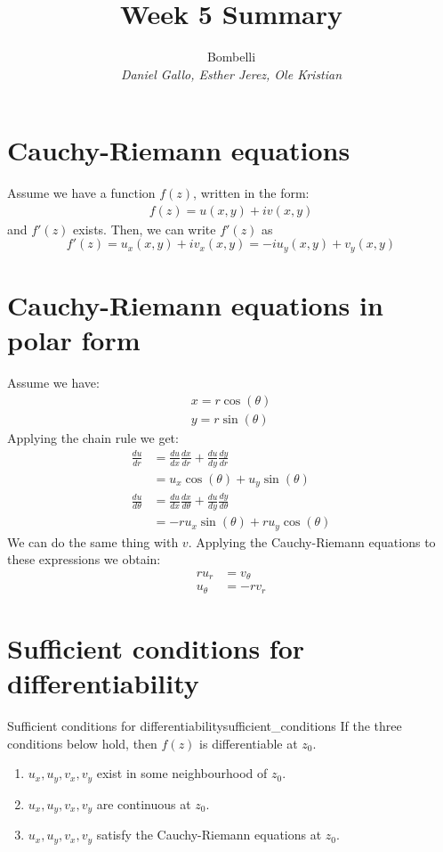 \documentclass{article}
\title{Week 5 Summary}
\author{
    Bombelli \\
    \textit{Daniel Gallo, Esther Jerez, Ole Kristian}
}
\begin{document}
    \maketitle
    \noindent
    
    \section{Cauchy-Riemann equations}
    Assume we have a function $f(z)$, written in the form:
    \begin{align*}
        f(z) = u(x,y) + iv(x,y)
    \end{align*}
    and $f'(z)$ exists. Then, we can write $f'(z)$ as
    \begin{equation*}
        f'(z) = u_x(x,y) + iv_x(x,y) = -iu_y(x,y) + v_y(x,y)
    \end{equation*}
    
    \section{Cauchy-Riemann equations in polar form}
    Assume we have:
    \begin{align*}
        x = r\cos(\theta) \\
        y = r\sin(\theta)
    \end{align*}
    Applying the chain rule we get:
    \begin{align*}
        \frac{du}{dr} &= \frac{du}{dx}\frac{dx}{dr} + \frac{du}{dy}\frac{dy}{dr} \\ 
        &= u_x\cos(\theta)+u_y\sin(\theta) \\
        \frac{du}{d\theta} &= \frac{du}{dx}\frac{dx}{d\theta} + \frac{du}{dy}\frac{dy}{d\theta} \\ 
        &= -ru_x\sin(\theta)+ru_y\cos(\theta)
    \end{align*}
    We can do the same thing with $v$. Applying the Cauchy-Riemann equations to these expressions we obtain:
    \begin{align*}
        ru_r &= v_\theta \\ u_\theta &= -rv_r
    \end{align*}

    \section{Sufficient conditions for differentiability}
    \begin{theorem}{Sufficient conditions for differentiability}{sufficient_conditions}
        If the three conditions below hold, then $f(z)$ is differentiable at $z_0$. 
        \begin{enumerate}
            \item $u_x, u_y, v_x, v_y$ exist in some neighbourhood of $z_0$.
            \item $u_x, u_y, v_x, v_y$ are continuous at $z_0$.
            \item $u_x, u_y, v_x, v_y$ satisfy the Cauchy-Riemann equations at $z_0$.
        \end{enumerate}
    \end{theorem}
\end{document}
